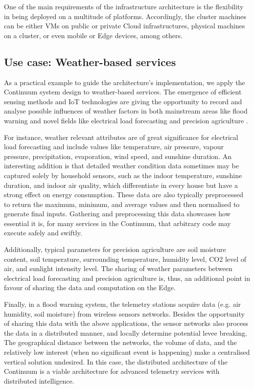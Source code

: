 One of the main requirements of the infrastructure architecture is the flexibility in being deployed on a multitude of platforms. Accordingly, the cluster machines can be either VMs on public or private Cloud infrastructures, physical machines on a cluster, or even mobile or Edge devices, among others.

\subsection{Use case: Weather-based services}\label{sec:uc}

As a practical example to guide the architecture's implementation, we apply the Continuum system design to weather-based services. The emergence of efficient sensing methods and IoT technologies are giving the opportunity to record and analyse possible influences of weather factors in both mainstream areas like flood warning \cite{brzoza2016embedded} and novel fields like electrical load forecasting \cite{weather-load-forecasting} and precision agriculture \cite{keswani2019adapting}.

For instance, weather relevant attributes are of great significance for electrical load forecasting and include values like temperature, air pressure, vapour pressure, precipitation, evaporation, wind speed, and sunshine duration. An interesting addition is that detailed weather condition data sometimes may be captured solely by household sensors, such as the indoor temperature, sunshine duration, and indoor air quality, which differentiate in every house but have a strong effect on energy consumption. These data are also typically preprocessed to return the maximum, minimum, and average values and then normalised to generate final inputs. Gathering and preprocessing this data showcases how essential it is, for many services in the Continuum, that arbitrary code may execute safely and swiftly.

Additionally, typical parameters for precision agriculture are soil moisture content, soil temperature, surrounding temperature, humidity level, CO2 level of air, and sunlight intensity level. The sharing of weather parameters between electrical load forecasting and precision agriculture is, thus, an additional point in favour of sharing the data and computation on the Edge.

Finally, in a flood warning system, the telemetry stations acquire data (e.g. air humidity, soil moisture) from wireless sensors networks. Besides the opportunity of sharing this data with the above applications, the sensor networks also process the data in a distributed manner, and locally determine potential levee breaking. The geographical distance between the networks, the volume of data, and the relatively low interest (when no significant event is happening) make a centralised vertical solution undesired. In this case, the distributed architecture of the Continuum is a viable architecture for advanced telemetry services with distributed intelligence.

